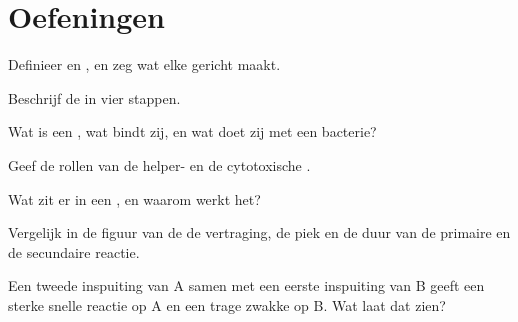 \section{Oefeningen}

\begin{exercise}[$\star$]\label{exo:g12:adaptive-immunity:1}
Definieer  en , en zeg wat elke  gericht maakt.
\end{exercise}

\begin{exercise}[$\star$]\label{exo:g12:adaptive-immunity:2}
Beschrijf de  in vier stappen.
\end{exercise}

\begin{exercise}[$\star$]\label{exo:g12:adaptive-immunity:3}
Wat is een , wat bindt zij, en wat doet zij met een bacterie?
\end{exercise}

\begin{exercise}[$\star$]\label{exo:g12:adaptive-immunity:4}
Geef de rollen van de helper- en de cytotoxische .
\end{exercise}

\begin{exercise}[$\star$]\label{exo:g12:adaptive-immunity:5}
Wat zit er in een , en waarom werkt het?
\end{exercise}

\begin{exercise}[$\star\star$]\label{exo:g12:adaptive-immunity:6}
Vergelijk in de figuur van de  de vertraging, de piek en de
duur van de primaire en de secundaire reactie.
\end{exercise}

\begin{exercise}[$\star\star$]\label{exo:g12:adaptive-immunity:7}
Een tweede inspuiting van  A samen met een eerste inspuiting van
 B geeft een sterke snelle reactie op A en een trage zwakke op B.
Wat laat dat zien?
\end{exercise}

